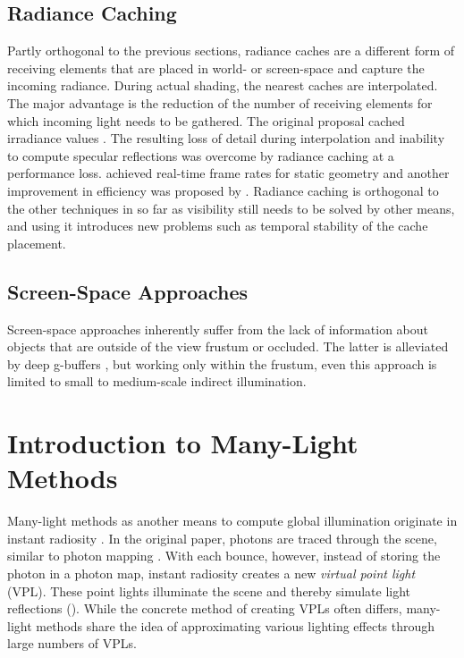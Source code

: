 \subsection{Radiance Caching}

Partly orthogonal to the previous sections, radiance caches are a different form of receiving elements that are placed in world- or screen-space and capture the incoming radiance. During actual shading, the nearest caches are interpolated. The major advantage is the reduction of the number of receiving elements for which incoming light needs to be gathered.
The original proposal cached irradiance values \citep{Ward:1988:IrradianceCaching}. The resulting loss of detail during interpolation and inability to compute specular reflections was overcome by radiance caching \citep{Krivanek:2005:RadianceCaching} at a performance loss. \citet{Scherzer:2012:PreconvolvedRadianceCaching} achieved real-time frame rates for static geometry and another improvement in efficiency was proposed by \citet{Rehfeld:2014:ClusteredPreconvolvedRadianceCaching}.
Radiance caching is orthogonal to the other techniques in so far as visibility still needs to be solved by other means, and using it introduces new problems such as temporal stability of the cache placement.


\subsection{Screen-Space Approaches}

Screen-space approaches inherently suffer from the lack of information about objects that are outside of the view frustum or occluded. The latter is alleviated by deep g-buffers \citep{Mara:2014:DeepGBuffers, Mara:2016:DeepGBuffers2}, but working only within the frustum, even this approach is limited to small to medium-scale indirect illumination.



\section{Introduction to Many-Light Methods}


Many-light methods as another means to compute global illumination originate in instant radiosity \citep{Keller:1997:InstantRadiosity}. In the original paper, photons are traced through the scene, similar to photon mapping \citep{Jensen:1996:PhotonMapping}. With each bounce, however, instead of storing the photon in a photon map, instant radiosity creates a new \emph{virtual point light} (VPL). These point lights illuminate the scene and thereby simulate light reflections (). While the concrete method of creating VPLs often differs, many-light methods share the idea of approximating various lighting effects through large numbers of VPLs.

